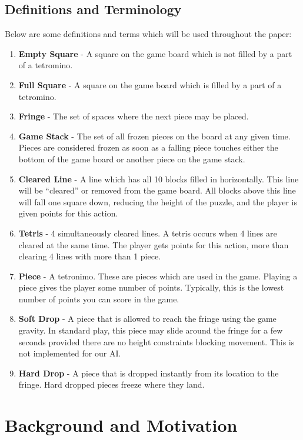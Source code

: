 \documentclass[12pt]{article}
\begin{document}
\subsection{Definitions and Terminology}
Below are some definitions and terms which will be used throughout the paper:
\begin{enumerate}
\item \textbf{Empty Square} - A square on the game board which is not filled by a part of a tetromino.
\item \textbf{Full Square} - A square on the game board which is filled by a part of a tetromino.
\item \textbf{Fringe} - The set of spaces where the next piece may be placed.
\item \textbf{Game Stack} - The set of all frozen pieces on the board at any given time. Pieces are considered frozen as soon as a falling piece touches either the bottom of the game board or another piece on the game stack.
\item \textbf{Cleared Line} - A line which has all 10 blocks filled in horizontally. This line will be ``cleared'' or removed from the game board. All blocks above this line will fall one square down, reducing the height of the puzzle, and the player is given points for this action.
\item \textbf{Tetris} - 4 simultaneously cleared lines. A tetris occurs when 4 lines are cleared at the same time. The player gets points for this action, more than clearing 4 lines with more than 1 piece.
\item \textbf{Piece} - A tetronimo. These are pieces which are used in the game. Playing a piece gives the player some number of points. Typically, this is the lowest number of points you can score in the game.
\item \textbf{Soft Drop} - A piece that is allowed to reach the fringe using the game gravity. In standard play, this piece may slide around the fringe for a few seconds provided there are no height constraints blocking movement. This is not implemented for our AI.
\item \textbf{Hard Drop} - A piece that is dropped instantly from its location to the fringe. Hard dropped pieces freeze where they land.
\end{enumerate}


\section{Background and Motivation}
\end{document}
